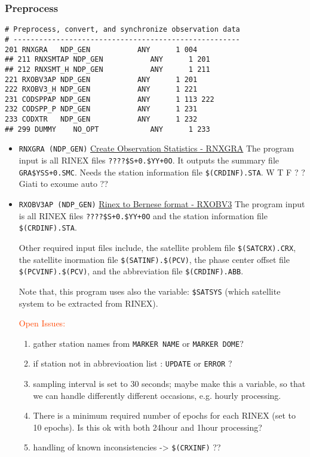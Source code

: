 \subsubsection{Preprocess}\label{ddp-prepro}
\begin{verbatim}
# Preprocess, convert, and synchronize observation data
# -----------------------------------------------------
201 RNXGRA   NDP_GEN           ANY      1 004
## 211 RNXSMTAP NDP_GEN           ANY      1 201
## 212 RNXSMT_H NDP_GEN           ANY      1 211
221 RXOBV3AP NDP_GEN           ANY      1 201
222 RXOBV3_H NDP_GEN           ANY      1 221
231 CODSPPAP NDP_GEN           ANY      1 113 222
232 CODSPP_P NDP_GEN           ANY      1 231
233 CODXTR   NDP_GEN           ANY      1 232
## 299 DUMMY    NO_OPT            ANY      1 233
\end{verbatim}
\begin{itemize}
  \item \texttt{RNXGRA (NDP\_GEN)} \underline{Create Observation Statistics - RNXGRA}
  The program input is all RINEX files \texttt{????\$S+0.\$YY+0O}. It outputs
  the summary file \texttt{GRA\$YSS+0.SMC}. Needs the station information file
  \texttt{\$(CRDINF).STA}. \textcolor{Cerulean}{W T F ? ? Giati to exoume auto ??}

  \item \texttt{RXOBV3AP (NDP\_GEN)} \underline{Rinex to Bernese format - RXOBV3}
    The program input is all RINEX files \texttt{????\$S+0.\$YY+0O} and the
    station information file \texttt{\$(CRDINF).STA}. 

    Other required input files include, the satellite problem file 
    \texttt{\$(SATCRX).CRX}, the satellite inormation file \texttt{\$(SATINF).\$(PCV)},
    the phase center offset file \texttt{\$(PCVINF).\$(PCV)}, and the abbreviation
    file \texttt{\$(CRDINF).ABB}.

    Note that, this program uses also the variable: \texttt{\$SATSYS} (which
    satellite system to be extracted from RINEX).

    \textcolor{OrangeRed}{Open Issues:}
    \begin{enumerate}
      \item gather station names from \texttt{MARKER NAME} or \texttt{MARKER DOME}?
      \item if station not in abbrevioation list : \texttt{UPDATE} or \texttt{ERROR} ?
      \item sampling interval is set to 30 seconds; maybe make this a variable,
        so that we can handle differently different occasions, e.g. hourly
        processing.
      \item There is a minimum required number of epochs for each RINEX (set to
        10 epochs). Is this ok with both 24hour and 1hour processing?
      \item handling of known inconsistencies -> \texttt{\$(CRXINF)} ??
    \end{enumerate}


\end{itemize}

